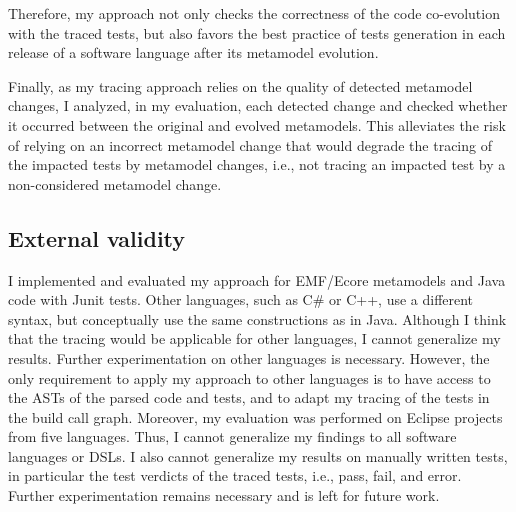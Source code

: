 Therefore, my approach not only checks the correctness of the code co-evolution with the traced tests, but also favors the best practice of tests generation in each release of a software language after its metamodel evolution.

Finally, as my tracing approach relies on the quality of detected metamodel changes, I analyzed, in my evaluation, each detected change and checked whether it occurred between the original and evolved metamodels. This alleviates the risk of relying on an incorrect metamodel change that would degrade the tracing of the impacted tests by metamodel changes, i.e., not tracing an impacted test by a non-considered metamodel change. 

\subsection{External validity} 
I implemented and evaluated my approach for EMF/Ecore metamodels and Java code with Junit tests. Other languages, such as C\# or C++, use a different syntax, but conceptually use the same constructions as in Java.
Although I think that the tracing would be applicable for other languages, I cannot generalize my results. Further experimentation on other languages is necessary. However, the only requirement to apply my approach to other languages is to have access to the ASTs of the parsed code and tests, and to adapt my tracing of the tests in the build call graph. 
%
Moreover, my evaluation was performed on Eclipse projects from five languages. Thus, I cannot generalize my findings to all software languages or DSLs. I also cannot generalize my results on manually written tests, in particular the test verdicts of the traced tests, i.e., pass, fail, and error. Further experimentation remains necessary and is left for future work. 

